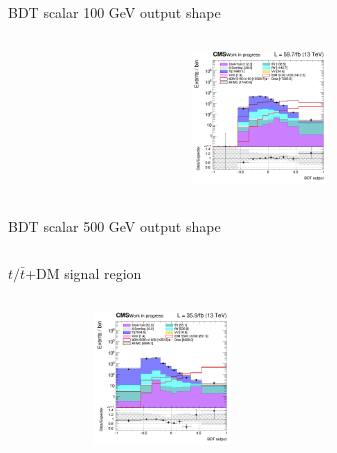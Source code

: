 \documentclass[8pt]{beamer}
\begin{document}
\begin{frame}{BDT scalar 100 GeV output shape}
\begin{columns}
\begin{column}{0.33\textwidth}
\begin{center}
     			\includegraphics[width=1.0\textwidth, height=100pt]{figs/2018/SmearSR-ttDM-scalar100/log_cratio_topCR_ll_TTbar_BDT_output_scalar100_customBinsAttempt7.png}
    		\end{center}		
		\end{column}
\end{columns} \vfill
\end{frame}

\begin{frame}{BDT scalar 500 GeV output shape}
\begin{columns}
\begin{column}{1.09\textwidth}
\begin{block}{\centering $t/\bar t$+DM signal region}\end{block} \vspace{10pt}
\end{column}
\end{columns} \vspace{-24pt}
\begin{columns}
		\begin{column}{0.33\textwidth}
			\begin{center}
			\begin{block}{}\end{block}	
     			\includegraphics[width=1.0\textwidth, height=100pt]{figs/2016/SmearSR-ttDM-scalar500/log_cratio_topCR_ll_ST_BDT_output_scalar500_customBinsAttempt7.png}
    		\end{center}		
		\end{column} 
		\begin{column}{0.33\textwidth}
			\begin{center}
			\begin{block}{}\end{block}	

\end{center}
\end{column}
\end{columns}
\end{frame}
\end{document}
